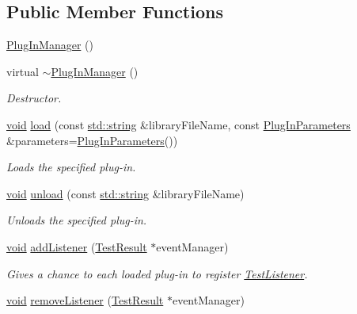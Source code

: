 \subsection*{Public Member Functions}
\begin{DoxyCompactItemize}
\item 
\hyperlink{class_plug_in_manager_a7789a7e258e750bd14267d20cac7d288}{Plug\-In\-Manager} ()
\item 
virtual \hyperlink{class_plug_in_manager_a093797f2d979b22fcf8df2230985b246}{$\sim$\-Plug\-In\-Manager} ()
\begin{DoxyCompactList}\small\item\em Destructor. \end{DoxyCompactList}\item 
\hyperlink{wglew_8h_aeea6e3dfae3acf232096f57d2d57f084}{void} \hyperlink{class_plug_in_manager_aa617ef22c19ff90d7a56cd048c975afa}{load} (const \hyperlink{glew_8h_ae84541b4f3d8e1ea24ec0f466a8c568b}{std\-::string} \&library\-File\-Name, const \hyperlink{class_plug_in_parameters}{Plug\-In\-Parameters} \&parameters=\hyperlink{class_plug_in_parameters}{Plug\-In\-Parameters}())
\begin{DoxyCompactList}\small\item\em Loads the specified plug-\/in. \end{DoxyCompactList}\item 
\hyperlink{wglew_8h_aeea6e3dfae3acf232096f57d2d57f084}{void} \hyperlink{class_plug_in_manager_a5366b1e0e2e96e84d09e26893c00c4bf}{unload} (const \hyperlink{glew_8h_ae84541b4f3d8e1ea24ec0f466a8c568b}{std\-::string} \&library\-File\-Name)
\begin{DoxyCompactList}\small\item\em Unloads the specified plug-\/in. \end{DoxyCompactList}\item 
\hyperlink{wglew_8h_aeea6e3dfae3acf232096f57d2d57f084}{void} \hyperlink{class_plug_in_manager_a3c51a256e3d6ee3bf6fa6c98d74053d1}{add\-Listener} (\hyperlink{class_test_result}{Test\-Result} $\ast$event\-Manager)
\begin{DoxyCompactList}\small\item\em Gives a chance to each loaded plug-\/in to register \hyperlink{class_test_listener}{Test\-Listener}. \end{DoxyCompactList}\item 
\hyperlink{wglew_8h_aeea6e3dfae3acf232096f57d2d57f084}{void} \hyperlink{class_plug_in_manager_aea9b8b61e256169b823516868e1d8ad0}{remove\-Listener} (\hyperlink{class_test_result}{Test\-Result} $\ast$event\-Manager)

\end{DoxyCompactItemize}
